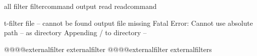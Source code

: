 

\startmodule    [filter]

\unprotect


\startinterface all
             {filter}
      {filtercommand}
             {output} 
               {read} 
        {readcommand} 
\stopinterface

\def\m!externalfilter{t-filter}


     {\m!externalfilter}
  {file -- cannot be found}
   {output file missing}
 {Fatal Error: Cannot use absolute path -- as directory}
     {Appending / to directory -- }


\def\????externalfilter{@@@@externalfilter}
\def\!!!!externalfilter{externalfilter}
\def\currentexternalfilter{}
\def\externalfiltercountername{\????externalfilter-\currentexternalfilter-counter}

\ifx\undefined\normalexpanded \let\normalexpanded\expanded \fi

\installparameterhandler \????externalfilter \!!!!externalfilter
\installsetuphandler     \????externalfilter {externalfilters} %

